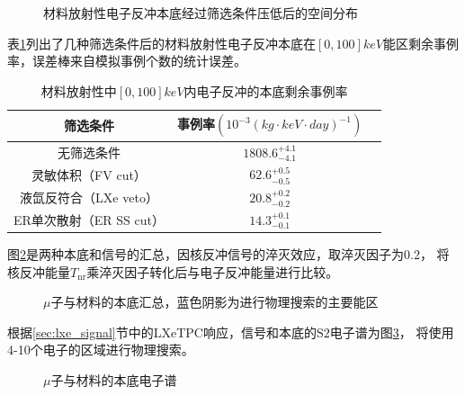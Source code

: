 \begin{figure}
  \centering
  
  \caption{\label{fig:material_er_xyzr} 材料放射性电子反冲本底经过筛选条件压低后的空间分布}
\end{figure}

表\ref{tab:cuts_material_remain}列出了几种筛选条件后的材料放射性电子反冲本底在$[0,100]\si{keV}$能区剩余事例率，误差棒来自模拟事例个数的统计误差。

\begin{table}
  \centering
  \caption{材料放射性中$[0,100]\si{keV}$内电子反冲的本底剩余事例率}
  \begin{tabular}{ccc}
    \toprule
    筛选条件 & 事例率$\left(10^{-3}\left(\si{kg}\cdot\si{keV}\cdot\si{day}\right)^{-1}\right)$ \\
    \midrule
    无筛选条件 & $1808.6_{-4.1}^{+4.1}$ \\
    灵敏体积（FV cut） & $62.6_{-0.5}^{+0.5}$ \\
    液氙反符合（LXe veto） & $20.8_{-0.2}^{+0.2}$ \\
    ER单次散射（ER SS cut） & $14.3_{-0.1}^{+0.1}$ \\
    \bottomrule
  \end{tabular}
  \label{tab:cuts_material_remain}
\end{table}

图\ref{fig:all_event_rate}是两种本底和信号的汇总，因核反冲信号的淬灭效应，取淬灭因子为0.2，
将核反冲能量$T_\mathrm{nr}$乘淬灭因子转化后与电子反冲能量进行比较。

\begin{figure}
  \centering
  
  \caption{\label{fig:all_event_rate} $\mu$子与材料的本底汇总，蓝色阴影为进行物理搜索的主要能区}
\end{figure}

根据\ref{sec:lxe_signal}节中的LXeTPC响应，信号和本底的$\mathrm{S2}$电子谱为图\ref{fig:S2e_rate_bkg}，
将使用4-10个电子的区域进行物理搜索。

\begin{figure}
  \centering
  
  \caption{\label{fig:S2e_rate_bkg} $\mu$子与材料的本底电子谱}
\end{figure}

